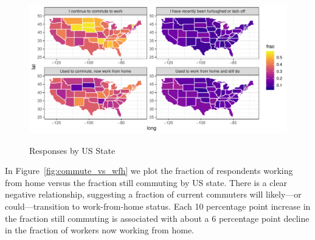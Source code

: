 \documentclass[12pt]{article}
\begin{document}
\begin{figure}
  \caption{Responses by US State} \label{fig:geo}
\centering
\begin{minipage}{1.0 \linewidth}
  \includegraphics[width = \linewidth]{plots/geo.pdf} \\
  \begin{footnotesize}
    \end{footnotesize}
\end{minipage}
\end{figure} 

In Figure~\ref{fig:commute_vs_wfh} we plot the fraction of respondents working from home versus the fraction still commuting by US state.
There is a clear negative relationship, suggesting a fraction of current commuters will likely---or could---transition to work-from-home status.
Each 10 percentage point increase in the fraction still commuting is associated with about a 6 percentage point decline in the fraction of workers now working from home. 
\end{document}
